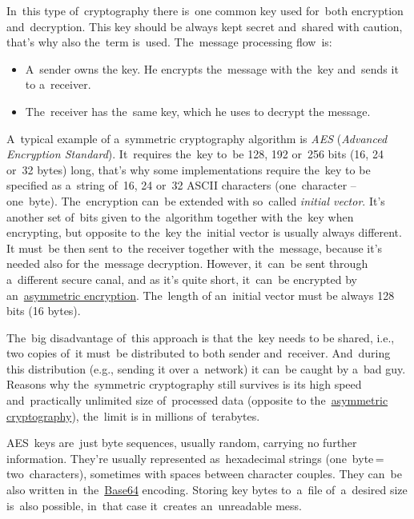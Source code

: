 \label{symmetriccryptography}
\enlargethispage{10mm}
In~this type of~cryptography there is~one common key used for~both encryption and~decryption.
This key should be always kept secret and~shared with caution, that's why also the~term  is~used.
The~message processing flow~is:
\begin{itemize}
    \item A~sender owns the key.
          He encrypts the~message with the~key and~sends it to a~receiver.
    \item The~receiver has the~same key, which he uses to decrypt the message.
\end{itemize}
\newpage

A~typical example of a~symmetric cryptography algorithm is \textit{AES} (\textit{Advanced Encryption Standard}).
It~requires the~key to~be 128, 192 or~256 bits (16, 24 or~32 bytes) long, that's why some implementations require the~key to be specified as a~string of~16, 24 or~32 ASCII characters (one~character -- one~byte).
The~encryption can~be extended with so~called \textit{initial vector}.
It's another set of~bits given to the~algorithm together with the~key when encrypting, but opposite to the~key the~initial vector is usually always different.
It must~be then sent to~the receiver together with the~message, because it's needed also for the~message decryption.
However, it~can~be sent through a~different secure canal, and as it's quite short, it~can~be encrypted by an~\hyperref[asymmetriccryptography]{asymmetric encryption}.
The~length of an~initial vector must be always 128 bits (16 bytes).

The~big disadvantage of~this approach is that the~key needs to be shared, i.e., two copies of~it must~be distributed to both sender and~receiver.
And~during this distribution (e.g., sending it over a~network) it can~be caught by a~bad guy.
Reasons why the~symmetric cryptography still survives is its high speed and~practically unlimited size of~processed data (opposite to the~\hyperref[asymmetriccryptography]{asymmetric cryptography}), the~limit is in millions of~\mbox{terabytes}.

AES~keys are~just byte sequences, usually random, carrying no further information.
They're usually represented as~hexadecimal strings (one~byte\,=\,two~characters), sometimes with spaces between character couples.
They can~be also written in~the~\hyperref[base64]{\mbox{Base64}} encoding.
Storing key bytes to~a~file of~a~desired size is~also possible, in~that case it~creates an~unreadable mess.
